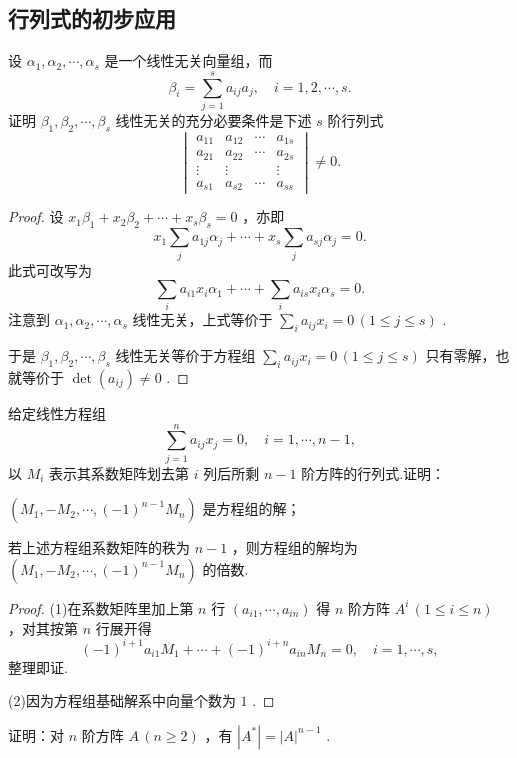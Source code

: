 \subsection{行列式的初步应用}
\begin{prob}[1]
	设 $\alpha_1,\alpha_2,\cdots,\alpha_s$ 是一个线性无关向量组，而
	\[
		\beta_i=\sum_{j=1}^{s}a_{ij}a_j,\quad i=1,2,\cdots,s.
	\]
	证明 $\beta_1,\beta_2,\cdots,\beta_s$ 线性无关的充分必要条件是下述 $s$ 阶行列式
	\[
		\begin{vmatrix}
			a_{11} & a_{12} & \cdots & a_{1s} \\
			a_{21} & a_{22} & \cdots & a_{2s} \\
			\vdots & \vdots &        & \vdots \\
			a_{s1} & a_{s2} & \cdots & a_{ss}
		\end{vmatrix}\ne0.
	\]
\end{prob}
\begin{proof}
	设 $x_1\beta_1+x_2\beta_2+\cdots+x_s\beta_s=0$ ，亦即
	\[
		x_1\sum_ja_{1j}\alpha_j+\cdots+x_s\sum_ja_{sj}\alpha_j=0.
	\]
	此式可改写为
	\[
		\sum_ia_{i1}x_i\alpha_1+\cdots+\sum_ia_{is}x_i\alpha_s=0.
	\]
	注意到 $\alpha_1,\alpha_2,\cdots,\alpha_s$ 线性无关，上式等价于 $\sum_ia_{ij}x_i=0\,(1\le j\le s)$ .

	于是 $\beta_1,\beta_2,\cdots,\beta_s$ 线性无关等价于方程组 $\sum_ia_{ij}x_i=0\,(1\le j\le s)$ 只有零解，也就等价于 $\det(a_{ij})\ne0$ .
\end{proof}
\begin{prob}[4]
	给定线性方程组
	\[
		\sum_{j=1}^na_{ij}x_j=0,\quad i=1,\cdots,n-1,
	\]
	以 $M_i$ 表示其系数矩阵划去第 $i$ 列后所剩 $n-1$ 阶方阵的行列式.证明：
	\begin{mylist}
		\item  $(M_1,-M_2,\cdots,(-1)^{n-1}M_n)$ 是方程组的解；
		\item 若上述方程组系数矩阵的秩为 $n-1$ ，则方程组的解均为 $(M_1,-M_2,\cdots,(-1)^{n-1}M_n)$ 的倍数.
	\end{mylist}
\end{prob}
\begin{proof}
	(1)在系数矩阵里加上第 $n$ 行 $(a_{i1},\cdots,a_{in})$ 得 $n$ 阶方阵 $A^i\,(1\le i\le n)$ ，对其按第 $n$ 行展开得
	\[
		(-1)^{i+1}a_{i1}M_1+\cdots+(-1)^{i+n}a_{in}M_n=0,\quad i=1,\cdots,s,
	\]
	整理即证.

	(2)因为方程组基础解系中向量个数为 $1$ .
\end{proof}
\begin{prob}[5]
	证明：对 $n$ 阶方阵 $A\,(n\ge2)$ ，有 $|A^*|=|A|^{n-1}$ .
\end{prob}
